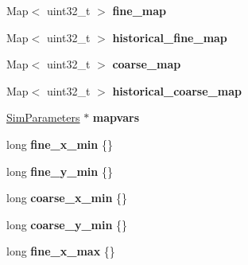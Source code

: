 \begin{DoxyCompactItemize}
\item 
Map$<$ uint32\+\_\+t $>$ {\bfseries fine\+\_\+map}\hypertarget{class_landscape_a8947e46b9be54b42a93fb0792d4a9ed4}{}\label{class_landscape_a8947e46b9be54b42a93fb0792d4a9ed4}

\item 
Map$<$ uint32\+\_\+t $>$ {\bfseries historical\+\_\+fine\+\_\+map}\hypertarget{class_landscape_a5e34fe2e75c3b84657a4edc75f9fcdec}{}\label{class_landscape_a5e34fe2e75c3b84657a4edc75f9fcdec}

\item 
Map$<$ uint32\+\_\+t $>$ {\bfseries coarse\+\_\+map}\hypertarget{class_landscape_a58c8bb6432b578dac46bdbdba9e759c9}{}\label{class_landscape_a58c8bb6432b578dac46bdbdba9e759c9}

\item 
Map$<$ uint32\+\_\+t $>$ {\bfseries historical\+\_\+coarse\+\_\+map}\hypertarget{class_landscape_a5ac41db1c48869d974c97393eb548dd8}{}\label{class_landscape_a5ac41db1c48869d974c97393eb548dd8}

\item 
\hyperlink{struct_sim_parameters}{Sim\+Parameters} $\ast$ {\bfseries mapvars}\hypertarget{class_landscape_aa3de03e94cea3c560df40bfa78b79f54}{}\label{class_landscape_aa3de03e94cea3c560df40bfa78b79f54}

\item 
long {\bfseries fine\+\_\+x\+\_\+min} \{\}\hypertarget{class_landscape_a95634ae0e15826160ad5c58a4093130d}{}\label{class_landscape_a95634ae0e15826160ad5c58a4093130d}

\item 
long {\bfseries fine\+\_\+y\+\_\+min} \{\}\hypertarget{class_landscape_a90e7fe904c80133338ac19aa13534ef9}{}\label{class_landscape_a90e7fe904c80133338ac19aa13534ef9}

\item 
long {\bfseries coarse\+\_\+x\+\_\+min} \{\}\hypertarget{class_landscape_a39dba789588465fe23055988ac52f217}{}\label{class_landscape_a39dba789588465fe23055988ac52f217}

\item 
long {\bfseries coarse\+\_\+y\+\_\+min} \{\}\hypertarget{class_landscape_a23b1484f4694fbc2a7c79af8d5e3fce5}{}\label{class_landscape_a23b1484f4694fbc2a7c79af8d5e3fce5}

\item 
long {\bfseries fine\+\_\+x\+\_\+max} \{\}\hypertarget{class_landscape_ac52242e6c558deb9a80478497d7320bc}{}\label{class_landscape_ac52242e6c558deb9a80478497d7320bc}


\end{DoxyCompactItemize}
